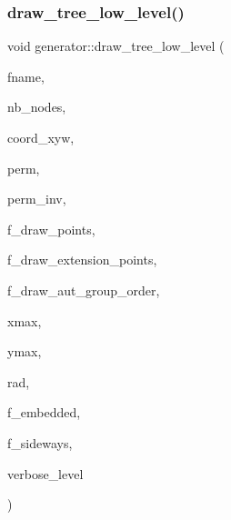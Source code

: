 \subsubsection{\texorpdfstring{draw\+\_\+tree\+\_\+low\+\_\+level()}{draw\_tree\_low\_level()}}
{\footnotesize\ttfamily void generator\+::draw\+\_\+tree\+\_\+low\+\_\+level (\begin{DoxyParamCaption}\item[{\mbox{\hyperlink{galois_8h_ab6cc7b4aeb6ea31aba2b3fbfc83ff5e6}{B\+Y\+TE}} $\ast$}]{fname,  }\item[{\mbox{\hyperlink{galois_8h_a09fddde158a3a20bd2dcadb609de11dc}{I\+NT}}}]{nb\+\_\+nodes,  }\item[{\mbox{\hyperlink{galois_8h_a09fddde158a3a20bd2dcadb609de11dc}{I\+NT}} $\ast$}]{coord\+\_\+xyw,  }\item[{\mbox{\hyperlink{galois_8h_a09fddde158a3a20bd2dcadb609de11dc}{I\+NT}} $\ast$}]{perm,  }\item[{\mbox{\hyperlink{galois_8h_a09fddde158a3a20bd2dcadb609de11dc}{I\+NT}} $\ast$}]{perm\+\_\+inv,  }\item[{\mbox{\hyperlink{galois_8h_a09fddde158a3a20bd2dcadb609de11dc}{I\+NT}}}]{f\+\_\+draw\+\_\+points,  }\item[{\mbox{\hyperlink{galois_8h_a09fddde158a3a20bd2dcadb609de11dc}{I\+NT}}}]{f\+\_\+draw\+\_\+extension\+\_\+points,  }\item[{\mbox{\hyperlink{galois_8h_a09fddde158a3a20bd2dcadb609de11dc}{I\+NT}}}]{f\+\_\+draw\+\_\+aut\+\_\+group\+\_\+order,  }\item[{\mbox{\hyperlink{galois_8h_a09fddde158a3a20bd2dcadb609de11dc}{I\+NT}}}]{xmax,  }\item[{\mbox{\hyperlink{galois_8h_a09fddde158a3a20bd2dcadb609de11dc}{I\+NT}}}]{ymax,  }\item[{\mbox{\hyperlink{galois_8h_a09fddde158a3a20bd2dcadb609de11dc}{I\+NT}}}]{rad,  }\item[{\mbox{\hyperlink{galois_8h_a09fddde158a3a20bd2dcadb609de11dc}{I\+NT}}}]{f\+\_\+embedded,  }\item[{\mbox{\hyperlink{galois_8h_a09fddde158a3a20bd2dcadb609de11dc}{I\+NT}}}]{f\+\_\+sideways,  }\item[{\mbox{\hyperlink{galois_8h_a09fddde158a3a20bd2dcadb609de11dc}{I\+NT}}}]{verbose\+\_\+level }\end{DoxyParamCaption})}

\mbox{\label{classgenerator_a05c91a8f773c25fbad2e806201d5f0d3}} 
